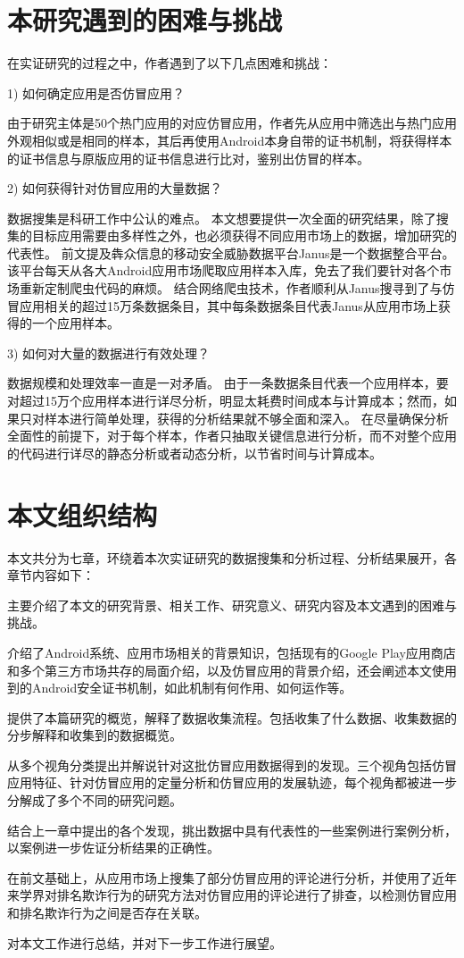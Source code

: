 \section{本研究遇到的困难与挑战}
在实证研究的过程之中，作者遇到了以下几点困难和挑战：

1)	如何确定应用是否仿冒应用？

由于研究主体是50个热门应用的对应仿冒应用，作者先从应用中筛选出与热门应用外观相似或是相同的样本，其后再使用Android本身自带的证书机制，将获得样本的证书信息与原版应用的证书信息进行比对，鉴别出仿冒的样本。

2)	如何获得针对仿冒应用的大量数据？

数据搜集是科研工作中公认的难点。
本文想要提供一次全面的研究结果，除了搜集的目标应用需要由多样性之外，也必须获得不同应用市场上的数据，增加研究的代表性。
前文提及犇众信息的移动安全威胁数据平台Janus是一个数据整合平台。该平台每天从各大Android应用市场爬取应用样本入库，免去了我们要针对各个市场重新定制爬虫代码的麻烦。
结合网络爬虫技术，作者顺利从Janus搜寻到了与仿冒应用相关的超过15万条数据条目，其中每条数据条目代表Janus从应用市场上获得的一个应用样本。

3)	如何对大量的数据进行有效处理？

数据规模和处理效率一直是一对矛盾。
由于一条数据条目代表一个应用样本，要对超过15万个应用样本进行详尽分析，明显太耗费时间成本与计算成本；然而，如果只对样本进行简单处理，获得的分析结果就不够全面和深入。
在尽量确保分析全面性的前提下，对于每个样本，作者只抽取关键信息进行分析，而不对整个应用的代码进行详尽的静态分析或者动态分析，以节省时间与计算成本。


\section{本文组织结构}
本文共分为七章，环绕着本次实证研究的数据搜集和分析过程、分析结果展开，各章节内容如下：

 主要介绍了本文的研究背景、相关工作、研究意义、研究内容及本文遇到的困难与挑战。

 介绍了Android系统、应用市场相关的背景知识，包括现有的Google Play应用商店和多个第三方市场共存的局面介绍，以及仿冒应用的背景介绍，还会阐述本文使用到的Android安全证书机制，如此机制有何作用、如何运作等。

 提供了本篇研究的概览，解释了数据收集流程。包括收集了什么数据、收集数据的分步解释和收集到的数据概览。

 从多个视角分类提出并解说针对这批仿冒应用数据得到的发现。三个视角包括仿冒应用特征、针对仿冒应用的定量分析和仿冒应用的发展轨迹，每个视角都被进一步分解成了多个不同的研究问题。

 结合上一章中提出的各个发现，挑出数据中具有代表性的一些案例进行案例分析，以案例进一步佐证分析结果的正确性。

 在前文基础上，从应用市场上搜集了部分仿冒应用的评论进行分析，并使用了近年来学界对排名欺诈行为的研究方法对仿冒应用的评论进行了排查，以检测仿冒应用和排名欺诈行为之间是否存在关联。

 对本文工作进行总结，并对下一步工作进行展望。
